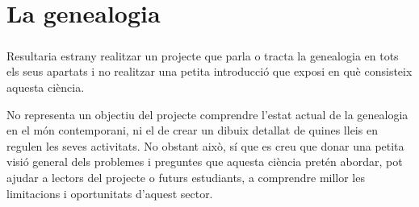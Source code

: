 \chapter{La genealogia}

    \paragraph{}
    Resultaria estrany realitzar un projecte que parla o tracta la genealogia en tots els seus apartats i no realitzar una petita introducció que exposi en què consisteix aquesta ciència.

    No representa un objectiu del projecte comprendre l’estat actual de la genealogia en el món contemporani, ni el de crear un dibuix detallat de quines lleis en regulen les seves activitats. No obstant això, sí que es creu que donar una petita visió general dels problemes i preguntes que aquesta ciència pretén abordar, pot ajudar a lectors del projecte o futurs estudiants, a comprendre millor les  limitacions i oportunitats d'aquest sector.

    
    
    
    
    
    
